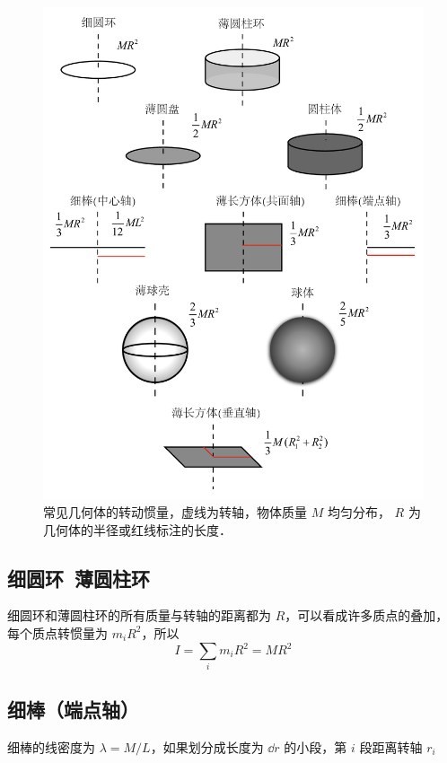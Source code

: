 

\begin{figure}[ht]
\centering
\includegraphics[width=12cm]{./figures/ExMI.pdf}
\caption{常见几何体的转动惯量，虚线为转轴，物体质量 $M$ 均匀分布， $R$ 为几何体的半径或红线标注的长度．}\label{ExMI_fig1}
\end{figure}

\subsection{细圆环\ 薄圆柱环}
细圆环和薄圆柱环的所有质量与转轴的距离都为 $R$，可以看成许多质点的叠加，每个质点转惯量为 $m_i R^2$，所以
\begin{equation}
I = \sum_i m_i R^2 = M R^2
\end{equation}

\subsection{ 细棒（端点轴）}
细棒的线密度为 $\lambda  = M/L$，如果划分成长度为 $\dd{r}$ 的小段，第 $i$ 段距离转轴 $r_i$

